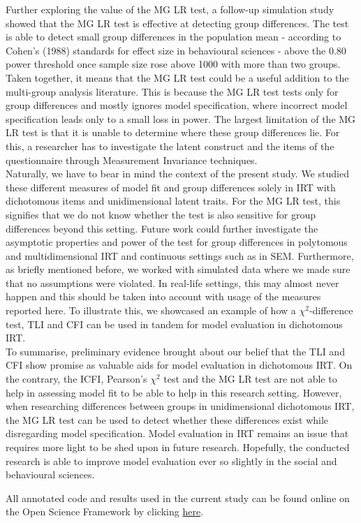 \documentclass[Royal,sageapa,times,doublespace]{sagej}
\begin{document}
\indent Further exploring the value of the MG LR test, a follow-up simulation study showed that the MG LR test is effective at detecting group differences. The test is able to detect small group differences in the population mean - according to Cohen's (1988) standards for effect size in behavioural sciences - above the 0.80 power threshold once sample size rose above 1000 with more than two groups. Taken together, it means that the MG LR test could be a useful addition to the multi-group analysis literature. This is because the MG LR test tests only for group differences and mostly ignores model specification, where incorrect model specification leads only to a small loss in power. %
The largest limitation of the MG LR test is that it is unable to determine where these group differences lie. For this, a researcher has to investigate the latent construct and the items of the questionnaire through Measurement Invariance techniques. \\
\indent Naturally, we have to bear in mind the context of the present study. We studied these different measures of model fit and group differences solely in IRT with dichotomous items and unidimensional latent traits. For the MG LR test, this signifies that we do not know whether the test is also sensitive for group differences beyond this setting. Future work could further investigate the asymptotic properties and power of the test for group differences in polytomous and multidimensional IRT and continuous settings such as in SEM. Furthermore, as briefly mentioned before, we worked with simulated data where we made sure that no assumptions were violated. In real-life settings, this may almost never happen and this should be taken into account with usage of the measures reported here. To illustrate this, we showcased an example of how a $\chi^2$-difference test, TLI and CFI can be used in tandem for model evaluation in dichotomous IRT. \\ %
\indent To summarise, preliminary evidence brought about our belief that the TLI and CFI show promise as valuable aids for model evaluation in dichotomous IRT. On the contrary, the ICFI, Pearson's $\chi^2$ test and the MG LR test are not able to help in assessing model fit to be able to help in this research setting. However, when researching differences between groups in unidimensional dichotomous IRT, the MG LR test can be used to detect whether these differences exist while disregarding model specification. Model evaluation in IRT remains an issue that requires more light to be shed upon in future research. Hopefully, the conducted research is able to improve model evaluation ever so slightly in the social and behavioural sciences. 

\begin{sm}
All annotated code and results used in the current study can be found online on the Open Science Framework by clicking \href{https://osf.io/dtbcr/?view_only=e32e5f8a43124434b5a53a44ff26ad23}{here}.
\end{sm}

\newpage

\nocite{*}


\end{document}
